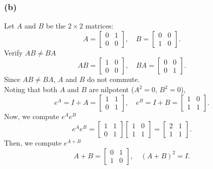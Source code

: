 \documentclass{article}
\begin{document}
    \subsubsection*{(b)}
    
    Let \( A \) and \( B \) be the \( 2 \times 2 \) matrices:
    \[
        A = \begin{bmatrix}
        0 & 1 \\ 0 & 0
        \end{bmatrix}, \quad
        B = \begin{bmatrix}
        0 & 0 \\ 1 & 0
        \end{bmatrix}.
    \]
    Verify \( AB \neq BA \)
    \[
        AB = \begin{bmatrix} 1 & 0 \\ 0 & 0 \end{bmatrix}, \quad
        BA = \begin{bmatrix} 0 & 0 \\ 0 & 1 \end{bmatrix}.
    \]
    Since \( AB \neq BA \), \( A \) and \( B \) do not commute.
    \\
    Noting that both \( A \) and \( B \) are nilpotent (\( A^2 = 0 \), \( B^2 = 0 \)),
    \[
        e^{A} = I + A = \begin{bmatrix}
        1 & 1 \\ 0 & 1
        \end{bmatrix}, \quad
        e^{B} = I + B = \begin{bmatrix}
        1 & 0 \\ 1 & 1
        \end{bmatrix}.
    \]
    Now, we compute \( e^{A} e^{B} \)
    \[
        e^{A} e^{B} = \begin{bmatrix}
        1 & 1 \\ 0 & 1
        \end{bmatrix}
        \begin{bmatrix}
        1 & 0 \\ 1 & 1
        \end{bmatrix}
        = \begin{bmatrix}
        2 & 1 \\ 1 & 1
        \end{bmatrix}.
    \]
    Then, we compute \( e^{A+B} \)
    \[
        A + B = \begin{bmatrix}
        0 & 1 \\ 1 & 0
        \end{bmatrix}, \quad
        (A+B)^2 = I.
    \]
\end{document}

